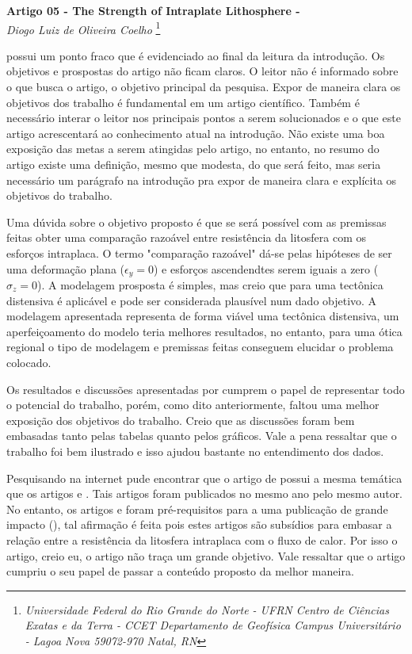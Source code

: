 \documentclass[manuscript]{geophysics}
\begin{document}
\begin{center}
\textbf{\LARGE
 Artigo 05 - The Strength of Intraplate Lithosphere - \cite{kusznir_strength_1984}} \\
\textit{Diogo Luiz de Oliveira Coelho}
\footnote{\textit{Universidade Federal do Rio Grande do Norte - UFRN
Centro de Ciências Exatas e da Terra - CCET
Departamento de Geofísica
Campus Universitário - Lagoa Nova
59072-970 Natal, RN}}
\end{center} 

\cite{kusznir_strength_1984} possui um ponto fraco que é evidenciado ao final da leitura da introdução. Os objetivos e prospostas do artigo não ficam claros. O leitor não é informado sobre o que busca o artigo, o objetivo principal da pesquisa. Expor de maneira clara os objetivos dos trabalho é fundamental em um artigo científico. Também é necessário interar o leitor nos principais pontos a serem solucionados e o que este artigo acrescentará ao conhecimento atual na introdução. Não existe uma boa exposição das metas a serem atingidas pelo artigo, no entanto, no resumo do artigo existe uma definição, mesmo que modesta, do que será feito, mas seria necessário um parágrafo na introdução pra expor de maneira clara e explícita os objetivos do trabalho.

Uma dúvida sobre o objetivo proposto é que se será possível com as premissas feitas obter uma comparação razoável entre resistência da litosfera com os esforços intraplaca. O termo "comparação razoável" dá-se pelas hipóteses de ser uma deformação plana ($\epsilon _{y} = 0$) e esforços ascendendtes serem iguais a zero ($\sigma _{z} = 0$). A modelagem prosposta é simples, mas creio que para uma tectônica distensiva é aplicável e pode ser considerada plausível num dado objetivo. A modelagem apresentada representa de forma viável uma tectônica distensiva, um aperfeiçoamento do modelo teria melhores resultados, no entanto, para uma ótica regional o tipo de modelagem e premissas feitas conseguem elucidar o problema colocado. 

Os resultados e discussões apresentadas por \cite{kusznir_strength_1984} cumprem o papel de representar todo o potencial do trabalho, porém, como dito anteriormente, faltou uma melhor exposição dos objetivos do trabalho. Creio que as discussões foram bem embasadas tanto pelas tabelas quanto pelos gráficos. Vale a pena ressaltar que o trabalho foi bem ilustrado e isso ajudou bastante no entendimento dos dados. 

Pesquisando na internet pude encontrar que o artigo de \cite{kusznir_strength_1984} possui a mesma temática que os artigos \cite{kusznir_intraplate_a_1984} e \cite{kusznir_intraplate_b_1984}. Tais artigos foram publicados no mesmo ano pelo mesmo autor. No entanto, os artigos \cite{kusznir_strength_1984} e \cite{kusznir_intraplate_b_1984} foram pré-requisitos para a uma publicação de grande impacto (\cite{kusznir_intraplate_a_1984}), tal afirmação é feita pois estes artigos são subsídios para embasar a relação entre a resistência da litosfera intraplaca com o fluxo de calor. Por isso o artigo, creio eu, o artigo não traça um grande objetivo. Vale ressaltar que o artigo cumpriu o seu papel de passar a conteúdo proposto da melhor maneira. 



    
\end{document}
